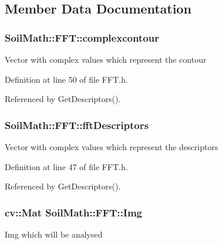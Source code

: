\subsection{Member Data Documentation}
\hypertarget{class_soil_math_1_1_f_f_t_a48141f0c777ca86f2e536f88b509b639}{}
\subsubsection[{complexcontour}]{ Soil\+Math\+::\+F\+F\+T\+::complexcontour\hspace{0.3cm}{\ttfamily [private]}}\label{class_soil_math_1_1_f_f_t_a48141f0c777ca86f2e536f88b509b639}
Vector with complex values which represent the contour 

Definition at line 50 of file F\+F\+T.\+h.



Referenced by Get\+Descriptors().

\hypertarget{class_soil_math_1_1_f_f_t_a466b360529319d0e6e3220f446f703be}{}
\subsubsection[{fft\+Descriptors}]{ Soil\+Math\+::\+F\+F\+T\+::fft\+Descriptors\hspace{0.3cm}{\ttfamily [private]}}\label{class_soil_math_1_1_f_f_t_a466b360529319d0e6e3220f446f703be}
Vector with complex values which represent the descriptors 

Definition at line 47 of file F\+F\+T.\+h.



Referenced by Get\+Descriptors().

\hypertarget{class_soil_math_1_1_f_f_t_a2efda8f90cd255a2c18352636352044f}{}
\subsubsection[{Img}]{\setlength{\rightskip}{0pt plus 5cm}cv\+::\+Mat Soil\+Math\+::\+F\+F\+T\+::\+Img\hspace{0.3cm}{\ttfamily [private]}}\label{class_soil_math_1_1_f_f_t_a2efda8f90cd255a2c18352636352044f}
Img which will be analysed 

